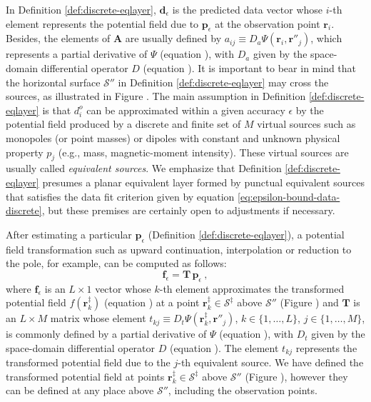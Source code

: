 In Definition \ref{def:discrete-eqlayer}, $\mathbf{d}_{\epsilon}$ is the predicted data vector whose 
$i$-th element represents the potential field due to $\mathbf{p}_{\epsilon}$ at the observation point $\mathbf{r}_{i}$. 
Besides, the elements of $\mathbf{A}$ are usually defined by 
$a_{ij} \equiv D_{a} \Psi(\mathbf{r}_{i}, \mathbf{r}''_{j})$, which represents a 
partial derivative of $\Psi$ (equation ), with $D_{a}$ given by the space-domain differential operator 
$D$ (equation ). 
It is important to bear in mind that the horizontal surface $\mathcal{S}''$ in Definition \ref{def:discrete-eqlayer} 
may cross the sources, as illustrated in Figure .
The main assumption in Definition \ref{def:discrete-eqlayer} is that $d^{o}_{i}$ can be approximated 
within a given accuracy $\epsilon$ by the potential field produced by a discrete and finite set of $M$ 
virtual sources such as monopoles (or point masses) or dipoles with 
constant and unknown physical property $p_{j}$ (e.g., mass, magnetic-moment intensity). 
These virtual sources are usually called \textit{equivalent sources}.
We emphasize that Definition \ref{def:discrete-eqlayer} presumes a planar equivalent layer formed 
by punctual equivalent sources that satisfies the data fit criterion given by equation \ref{eq:epsilon-bound-data-discrete}, 
but these premises are certainly open to adjustments if necessary.

After estimating a particular $\mathbf{p}_{\epsilon}$ (Definition \ref{def:discrete-eqlayer}), 
a potential field transformation such as upward continuation, 
interpolation or reduction to the pole, for example, can be computed as follows:
\begin{equation}
	\mathbf{f}_{\epsilon} = \mathbf{T} \, \mathbf{p}_{\epsilon} \: ,
	\label{eq:transformed-field-discrete-layer} 
\end{equation}
where $\mathbf{f}_{\epsilon}$ is an $L \times 1$ vector whose $k$-th element approximates 
the transformed potential field $f(\mathbf{r}^{\ddagger}_{k})$ (equation ) 
at a point $\mathbf{r}^{\ddagger}_{k} \in \mathcal{S}^{\ddagger}$ above $\mathcal{S}''$ (Figure )
and $\mathbf{T}$ is an $L \times M$ matrix whose element $t_{kj} \equiv D_{t} \Psi(\mathbf{r}^{\ddagger}_{k}, \mathbf{r}''_{j})$,
$k \in \{ 1, \dots, L \}$, $j \in \{ 1, \dots, M \}$, 
is commonly defined by a partial derivative of $\Psi$ (equation ), with $D_{t}$ given by the 
space-domain differential operator $D$ (equation ).
The element $t_{kj}$ represents the transformed potential field due to the $j$-th equivalent source. 
We have defined the transformed potential field at points 
$\mathbf{r}^{\ddagger}_{k} \in \mathcal{S}^{\ddagger}$ above $\mathcal{S}''$ (Figure ), however they 
can be defined at any place above $\mathcal{S}''$, including the observation points. 

